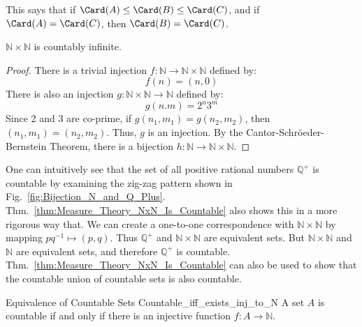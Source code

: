 \documentclass[crop=false,class=book,oneside]{standalone}
\begin{document}
            \par\hfill\par
            This says that if $\Card(A)\leq\Card(B)\leq\Card(C)$,
            and if $\Card(A)=\Card(C)$, then $\Card(B)=\Card(C)$.
            \begin{theorem}
                \label{thm:Measure_Theory_NxN_Is_Countable}
                $\mathbb{N}\times\mathbb{N}$ is countably infinite.
            \end{theorem}
            \begin{proof}
                There is a trivial injection
                $f:\mathbb{N}\rightarrow\mathbb{N}\times\mathbb{N}$
                defined by:
                \begin{equation}
                    f(n)=(n,0)
                \end{equation}
                There is also an injection
                $g:\mathbb{N}\times\mathbb{N}\rightarrow\mathbb{N}$
                defined by:
                \begin{equation}
                    g(n.m)=2^{n}3^{m}
                \end{equation}
                Since 2 and 3 are co-prime, if
                $g(n_{1},m_{1})=g(n_{2},m_{2})$, then
                $(n_{1},m_{1})=(n_{2},m_{2})$. Thus, $g$ is an injection.
                By the Cantor-Schr\"{o}eder-Bernstein Theorem, there is a
                bijection $h:\mathbb{N}\rightarrow\mathbb{N}\times\mathbb{N}$.
            \end{proof}
            One can intuitively see that the set of all positive
            rational numbers $\mathbb{Q}^{+}$ is countable by examining
            the zig-zag pattern shown in
            Fig.~\ref{fig:Bijection_N_and_Q_Plus}.
            Thm.~\ref{thm:Measure_Theory_NxN_Is_Countable} also
            shows this in a more rigorous way that. We can create
            a one-to-one correspondence with
            $\mathbb{N}\times\mathbb{N}$ by mapping
            $pq^{\minus{1}}\mapsto(p,q)$. Thus $\mathbb{Q}^{+}$
            and $\mathbb{N}\times\mathbb{N}$ are equivalent sets.
            But $\mathbb{N}\times\mathbb{N}$ and $\mathbb{N}$
            are equivalent sets, and therefore $\mathbb{Q}^{+}$
            is countable.
            Thm.~\ref{thm:Measure_Theory_NxN_Is_Countable} can also be used
            to show that the countable union of countable sets is also
            countable.
            \begin{ltheorem}{Equivalence of Countable Sets}
                  {Countable_iff_exists_inj_to_N}
                A set $A$ is countable if and only if there is an injective
                function $f:A\rightarrow\mathbb{N}$.
            \end{ltheorem}
\end{document}
